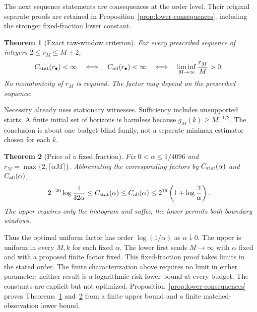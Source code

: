 \documentclass[11pt,letterpaper]{article}
\newtheorem{theorem}{Theorem}[section]
\theoremstyle{definition}
\theoremstyle{remark}
\numberwithin{equation}{section}
\begin{document}
The next sequence statements are consequences at the order level. Their
original separate proofs are retained in
Proposition~\ref{prop:lower-consequences}, including the stronger
fixed-fraction lower constant.

\begin{theorem}[Exact raw-window criterion]\label{thm:width}
For every prescribed sequence of integers $2\le r_M\le M+2$,
\[
 C_{\rm stat}(r_\bullet)<\infty
 \quad\Longleftrightarrow\quad C_{\rm all}(r_\bullet)<\infty
 \quad\Longleftrightarrow\quad
 \liminf_{M\to\infty}\frac{r_M}{M}>0.
\]
No monotonicity of $r_M$ is required. The factor may depend on the prescribed sequence.
\end{theorem}
Necessity already uses stationary witnesses. Sufficiency includes unsupported starts. A finite initial set of horizons is harmless because $g_M(k)\ge M^{-1/2}$. The conclusion is about one budget-blind family, not a separate minimax estimator chosen for each $k$.

\begin{theorem}[Price of a fixed fraction]\label{thm:fraction}
Fix $0<\alpha\le1/4096$ and $r_M=\max\{2,\lceil\alpha M\rceil\}$. Abbreviating the corresponding factors by $C_{\rm stat}(\alpha)$ and $C_{\rm all}(\alpha)$,
\begin{equation}\label{eq:fraction}
 2^{-26}\log\frac1{32\alpha}
 \le C_{\rm stat}(\alpha)\le C_{\rm all}(\alpha)
 \le2^{19}\left(1+\log\frac2\alpha\right).
\end{equation}
The upper requires only the histogram and suffix; the lower permits both boundary windows.
\end{theorem}
Thus the optimal uniform factor has order $\log(1/\alpha)$ as $\alpha\downarrow0$. The upper is uniform in every $M,k$ for each fixed $\alpha$. The lower first sends $M\to\infty$ with $\alpha$ fixed and with a proposed finite factor fixed. This fixed-fraction proof takes limits in the stated order. The finite characterization above requires no limit in either parameter; neither result is a logarithmic risk lower bound at every budget. The constants are explicit but not optimized. Proposition~\ref{prop:lower-consequences} proves Theorems~\ref{thm:width} and~\ref{thm:fraction} from a finite upper bound and a finite matched-observation lower bound.
\end{document}
